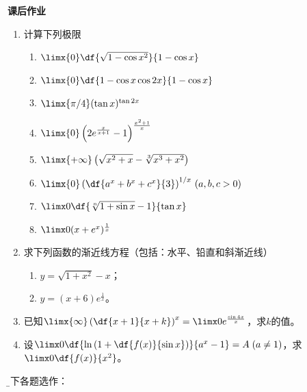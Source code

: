 \begin{ext}
	{\centering\bf 课后作业}
	
	\begin{enumerate}  
	  \item 计算下列极限
	  \begin{enumerate}[(1)]
		\item $\limx{0}\df{\sqrt{1-\cos x^2}}{1-\cos x}$ 
		\item $\limx{0}\df{1-\cos x\cos 2x}{1-\cos x}$
		\item $\limx{\pi /4}(\tan x)^{\tan 2x}$ 
		\item $\limx{0}\left(2e^{\frac{x}{x+1}}-1\right)^{\frac{x^2+1}{x}}$ 
		\item $\limx{+\infty}\left(\sqrt{x^2+x}-\sqrt[3]{x^3+x^2}\right)$ 
		\item $\limx{0}\left(\df{a^x+b^x+c^x}{3}\right)^{1/x}\,(a,b,c>0)$  
		\item $\limx0\df{\sqrt[n]{1+\sin x}-1}{\tan x}$
		\item $\limx0(x+e^x)^{\frac1x}$
	  \end{enumerate}
	  \item 求下列函数的渐近线方程（包括：水平、铅直和斜渐近线）
	  \begin{enumerate}[(1)]
	    \item $y=\sqrt{1+x^2}-x$；
	    \item $y=(x+6)e^{\frac1x}$。
	  \end{enumerate}
	  \item 已知$\limx{\infty}\left(\df{x+1}{x+k}\right)^x
	  =\limx0e^{\frac{\sin 4x}x}$，求$k$的值。
	  \item 设$\limx0\df{\ln\left(1+\df{f(x)}{\sin x}\right)}{a^x-1}=A\;(a\ne 1)$，求
		$\limx0\df{f(x)}{x^2}$。
	\end{enumerate}
	\tcblower
	{\kaishu\b 以下各题选作：}
	

\end{ext}
